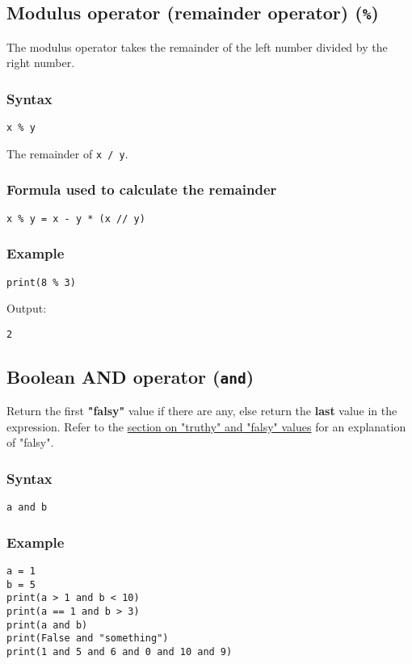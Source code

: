 \documentclass[11pt]{article}
\begin{document}
\subsection{Modulus operator (remainder operator) (\texttt{\%})}
\label{sec:orgcccd81a}
The modulus operator takes the remainder of the left number divided by the right number.

\subsubsection{Syntax}
\label{sec:org25b461d}
\texttt{x \% y}

 \noindent The remainder of \texttt{x / y}.

\subsubsection{Formula used to calculate the remainder}
\label{sec:org1f9b059}
\texttt{x \% y = x - y * (x // y)}

\subsubsection{Example}
\label{sec:orga9d9c68}
\begin{verbatim}
print(8 % 3)
\end{verbatim}

 \noindent Output:

\begin{verbatim}
2
\end{verbatim}


 \newpage

\subsection{Boolean AND operator (\texttt{and})}
\label{sec:orgf898fdc}
Return the first \textbf{"falsy"} value if there are any, else return the \textbf{last} value in the expression. Refer to the \hyperref[orgf40bd7d]{section on "truthy" and "falsy" values} for an explanation of "falsy".

\subsubsection{Syntax}
\label{sec:org1632c42}
\begin{verbatim}
a and b
\end{verbatim}

\subsubsection{Example}
\label{sec:org20dfc11}
\begin{verbatim}
a = 1
b = 5
print(a > 1 and b < 10)
print(a == 1 and b > 3)
print(a and b)
print(False and "something")
print(1 and 5 and 6 and 0 and 10 and 9)
\end{verbatim}
\end{document}
